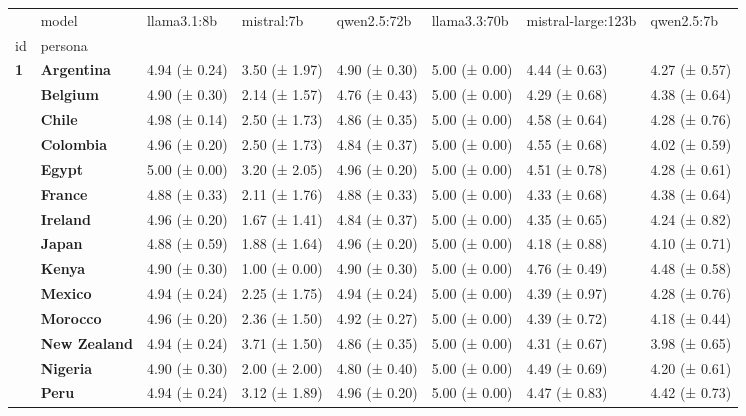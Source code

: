 \begin{tabular}{llllllll}
\toprule
 & model & llama3.1:8b & mistral:7b & qwen2.5:72b & llama3.3:70b & mistral-large:123b & qwen2.5:7b \\
id & persona &  &  &  &  &  &  \\
\midrule
\multirow[t]{19}{*}{\textbf{1}} & \textbf{Argentina} & 4.94 (± 0.24) & 3.50 (± 1.97) & 4.90 (± 0.30) & 5.00 (± 0.00) & 4.44 (± 0.63) & 4.27 (± 0.57) \\
\textbf{} & \textbf{Belgium} & 4.90 (± 0.30) & 2.14 (± 1.57) & 4.76 (± 0.43) & 5.00 (± 0.00) & 4.29 (± 0.68) & 4.38 (± 0.64) \\
\textbf{} & \textbf{Chile} & 4.98 (± 0.14) & 2.50 (± 1.73) & 4.86 (± 0.35) & 5.00 (± 0.00) & 4.58 (± 0.64) & 4.28 (± 0.76) \\
\textbf{} & \textbf{Colombia} & 4.96 (± 0.20) & 2.50 (± 1.73) & 4.84 (± 0.37) & 5.00 (± 0.00) & 4.55 (± 0.68) & 4.02 (± 0.59) \\
\textbf{} & \textbf{Egypt} & 5.00 (± 0.00) & 3.20 (± 2.05) & 4.96 (± 0.20) & 5.00 (± 0.00) & 4.51 (± 0.78) & 4.28 (± 0.61) \\
\textbf{} & \textbf{France} & 4.88 (± 0.33) & 2.11 (± 1.76) & 4.88 (± 0.33) & 5.00 (± 0.00) & 4.33 (± 0.68) & 4.38 (± 0.64) \\
\textbf{} & \textbf{Ireland} & 4.96 (± 0.20) & 1.67 (± 1.41) & 4.84 (± 0.37) & 5.00 (± 0.00) & 4.35 (± 0.65) & 4.24 (± 0.82) \\
\textbf{} & \textbf{Japan} & 4.88 (± 0.59) & 1.88 (± 1.64) & 4.96 (± 0.20) & 5.00 (± 0.00) & 4.18 (± 0.88) & 4.10 (± 0.71) \\
\textbf{} & \textbf{Kenya} & 4.90 (± 0.30) & 1.00 (± 0.00) & 4.90 (± 0.30) & 5.00 (± 0.00) & 4.76 (± 0.49) & 4.48 (± 0.58) \\
\textbf{} & \textbf{Mexico} & 4.94 (± 0.24) & 2.25 (± 1.75) & 4.94 (± 0.24) & 5.00 (± 0.00) & 4.39 (± 0.97) & 4.28 (± 0.76) \\
\textbf{} & \textbf{Morocco} & 4.96 (± 0.20) & 2.36 (± 1.50) & 4.92 (± 0.27) & 5.00 (± 0.00) & 4.39 (± 0.72) & 4.18 (± 0.44) \\
\textbf{} & \textbf{New Zealand} & 4.94 (± 0.24) & 3.71 (± 1.50) & 4.86 (± 0.35) & 5.00 (± 0.00) & 4.31 (± 0.67) & 3.98 (± 0.65) \\
\textbf{} & \textbf{Nigeria} & 4.90 (± 0.30) & 2.00 (± 2.00) & 4.80 (± 0.40) & 5.00 (± 0.00) & 4.49 (± 0.69) & 4.20 (± 0.61) \\
\textbf{} & \textbf{Peru} & 4.94 (± 0.24) & 3.12 (± 1.89) & 4.96 (± 0.20) & 5.00 (± 0.00) & 4.47 (± 0.83) & 4.42 (± 0.73) \\

\end{tabular}
